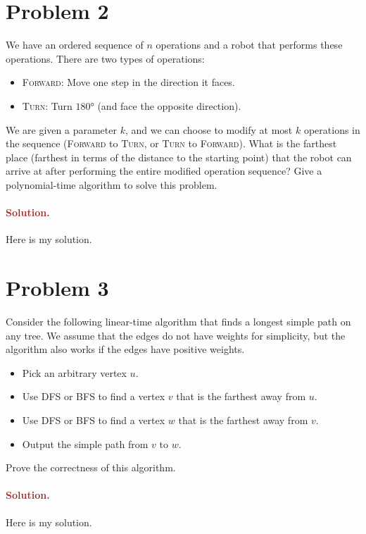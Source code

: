 \section*{Problem 2}
We have an ordered sequence of $n$ operations and a robot that performs these operations. There are two types of operations:
\begin{itemize}
    \item \textsc{Forward}: Move one step in the direction it faces.
    \item \textsc{Turn}: Turn $\ang{180}$ (and face the opposite direction).
\end{itemize}
We are given a parameter $k$, and we can choose to modify at most $k$ operations in the sequence (\textsc{Forward} to \textsc{Turn}, or \textsc{Turn} to \textsc{Forward}). What is the farthest place (farthest in terms of the distance to the starting point) that the robot can arrive at after performing the entire modified operation sequence? Give a polynomial-time algorithm to solve this problem.

\paragraph{\textcolor{brown}{Solution.}}
Here is my solution.


\section*{Problem 3}
Consider the following linear-time algorithm that finds a longest simple path on any tree. We assume that the edges do not have weights for simplicity, but the algorithm also works if the edges have positive weights.
\begin{itemize}
    \item Pick an arbitrary vertex $u$.
    \item Use DFS or BFS to find a vertex $v$ that is the farthest away from $u$.
    \item Use DFS or BFS to find a vertex $w$ that is the farthest away from $v$.
    \item Output the simple path from $v$ to $w$.
\end{itemize}
Prove the correctness of this algorithm.

\paragraph{\textcolor{brown}{Solution.}}
Here is my solution.


